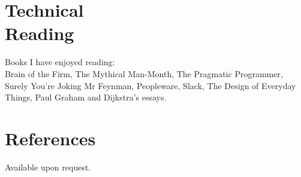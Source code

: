 \documentclass[line,margin]{res}
\begin{document}
\begin{resume}
\section{Technical \\ Reading}
Books I have enjoyed reading: \\
Brain of the Firm,
The Mythical Man-Month, %
The Pragmatic Programmer,
Surely You're Joking Mr Feynman,
Peopleware, %
Slack,
The Design of Everyday Things,
Paul Graham and Dijkstra's essays.

\section{References}
Available upon request.

\end{resume}
\end{document}
